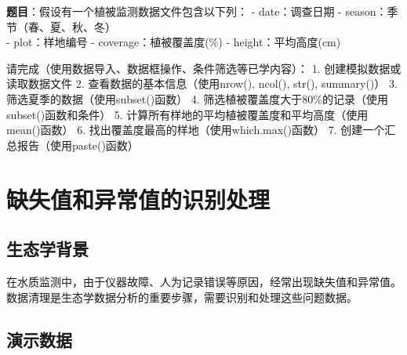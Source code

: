 \documentclass[
]{book}
\begin{document}
\textbf{题目}：假设有一个植被监测数据文件包含以下列：
- date：调查日期
- season：季节（春、夏、秋、冬）\\
- plot：样地编号
- coverage：植被覆盖度(\%)
- height：平均高度(cm)

请完成（使用数据导入、数据框操作、条件筛选等已学内容）：
1. 创建模拟数据或读取数据文件
2. 查看数据的基本信息（使用nrow(), ncol(), str(), summary()）
3. 筛选夏季的数据（使用subset()函数）
4. 筛选植被覆盖度大于80\%的记录（使用subset()函数和条件）
5. 计算所有样地的平均植被覆盖度和平均高度（使用mean()函数）
6. 找出覆盖度最高的样地（使用which.max()函数）
7. 创建一个汇总报告（使用paste()函数）

\hypertarget{ux7f3aux5931ux503cux548cux5f02ux5e38ux503cux7684ux8bc6ux522bux5904ux7406}{%
\section{缺失值和异常值的识别处理}\label{ux7f3aux5931ux503cux548cux5f02ux5e38ux503cux7684ux8bc6ux522bux5904ux7406}}

\hypertarget{ux751fux6001ux5b66ux80ccux666f-5}{%
\subsection{生态学背景}\label{ux751fux6001ux5b66ux80ccux666f-5}}

在水质监测中，由于仪器故障、人为记录错误等原因，经常出现缺失值和异常值。数据清理是生态学数据分析的重要步骤，需要识别和处理这些问题数据。

\hypertarget{ux6f14ux793aux6570ux636e-4}{%
\subsection{演示数据}\label{ux6f14ux793aux6570ux636e-4}}
\end{document}
